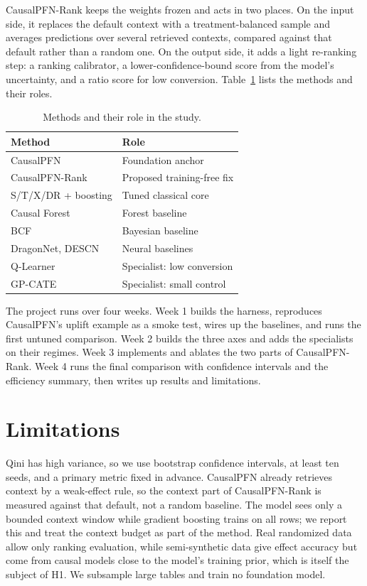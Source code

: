 \documentclass[twocolumn]{style}
\begin{document}
CausalPFN-Rank keeps the weights frozen and acts in two places. On the input side, it replaces the
default context with a treatment-balanced sample and averages predictions over several retrieved
contexts, compared against that default rather than a random one. On the output side, it adds a light
re-ranking step: a ranking calibrator, a lower-confidence-bound score from the model's uncertainty,
and a ratio score for low conversion. Table~\ref{tab:methods} lists the methods and their roles.

\begin{table}[!htpb]
    \caption{Methods and their role in the study.}
    \label{tab:methods}
    \centering
    \begin{tabularx}{\linewidth}{lX}
        \toprule
        \textbf{Method} & \textbf{Role} \\
        \midrule
        CausalPFN & Foundation anchor \\
        CausalPFN-Rank & Proposed training-free fix \\
        S/T/X/DR + boosting & Tuned classical core \\
        Causal Forest & Forest baseline \\
        BCF & Bayesian baseline \\
        DragonNet, DESCN & Neural baselines \\
        Q-Learner & Specialist: low conversion \\
        GP-CATE & Specialist: small control \\
        \bottomrule
    \end{tabularx}
\end{table}

The project runs over four weeks. Week 1 builds the harness, reproduces CausalPFN's uplift example as
a smoke test, wires up the baselines, and runs the first untuned comparison. Week 2 builds the three
axes and adds the specialists on their regimes. Week 3 implements and ablates the two parts of
CausalPFN-Rank. Week 4 runs the final comparison with confidence intervals and the efficiency
summary, then writes up results and limitations.

\section*{Limitations}
Qini has high variance, so we use bootstrap confidence intervals, at least ten seeds, and a primary
metric fixed in advance. CausalPFN already retrieves context by a weak-effect rule, so the context
part of CausalPFN-Rank is measured against that default, not a random baseline. The model sees only a
bounded context window while gradient boosting trains on all rows; we report this and treat the
context budget as part of the method. Real randomized data allow only ranking evaluation, while
semi-synthetic data give effect accuracy but come from causal models close to the model's training
prior, which is itself the subject of H1. We subsample large tables and train no foundation model.

\printbibliography
\end{document}
